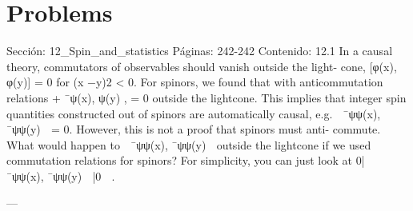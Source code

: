 \section*{Problems}
Sección: 12_Spin_and_statistics
Páginas: 242-242
Contenido:
12.1 In a causal theory, commutators of observables should vanish outside the light-
cone, [φ(x), φ(y)] = 0 for (x −y)2 < 0. For spinors, we found that with
anticommutation relations
+ ¯ψ(x), ψ(y)
,
= 0 outside the lightcone. This implies
that integer spin quantities constructed out of spinors are automatically causal,
e.g.
 ¯ψψ(x), ¯ψψ(y)

= 0. However, this is not a proof that spinors must anti-
commute. What would happen to
 ¯ψψ(x), ¯ψψ(y)

outside the lightcone if we
used commutation relations for spinors? For simplicity, you can just look at
0|
 ¯ψψ(x), ¯ψψ(y)

|0

.


---

